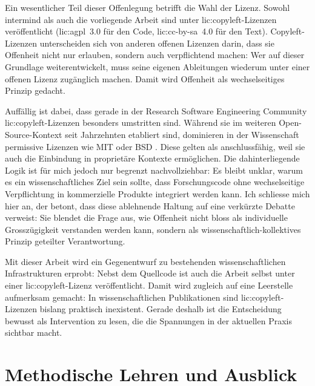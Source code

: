 Ein wesentlicher Teil dieser Offenlegung betrifft die Wahl der Lizenz. Sowohl \gls{intermind} als auch die vorliegende Arbeit sind unter \gls{lic:copyleft}-Lizenzen veröffentlicht (\gls{lic:agpl}~3.0 für den Code, \gls{lic:cc-by-sa}~4.0 für den Text). Copyleft-Lizenzen unterscheiden sich von anderen offenen Lizenzen darin, dass sie Offenheit nicht nur erlauben, sondern auch verpflichtend machen: Wer auf dieser Grundlage weiterentwickelt, muss seine eigenen Ableitungen wiederum unter einer offenen Lizenz zugänglich machen. Damit wird Offenheit als wechselseitiges Prinzip gedacht.

Auffällig ist dabei, dass gerade in der Research Software Engineering Community \gls{lic:copyleft}-Lizenzen besonders umstritten sind. Während sie im weiteren Open-Source-Kontext seit Jahrzehnten etabliert sind, dominieren in der Wissenschaft permissive Lizenzen wie MIT oder BSD \parencite{sethiWhyEarthAre2020}. Diese gelten als anschlussfähig, weil sie auch die Einbindung in proprietäre Kontexte ermöglichen. Die dahinterliegende Logik ist für mich jedoch nur begrenzt nachvollziehbar: Es bleibt unklar, warum es ein wissenschaftliches Ziel sein sollte, dass Forschungscode ohne wechselseitige Verpflichtung in kommerzielle Produkte integriert werden kann. Ich schliesse mich hier \textcite{sethiWhyEarthAre2020} an, der betont, dass diese ablehnende Haltung auf eine verkürzte Debatte verweist: Sie blendet die Frage aus, wie Offenheit nicht bloss als individuelle Grosszügigkeit verstanden werden kann, sondern als wissenschaftlich-kollektives Prinzip geteilter Verantwortung.

Mit dieser Arbeit wird ein Gegenentwurf zu bestehenden wissenschaftlichen Infrastrukturen erprobt: Nebst dem Quellcode ist auch die Arbeit selbst unter einer \gls{lic:copyleft}-Lizenz veröffentlicht. Damit wird zugleich auf eine Leerstelle aufmerksam gemacht: In wissenschaftlichen Publikationen sind \gls{lic:copyleft}-Lizenzen bislang praktisch inexistent. Gerade deshalb ist die Entscheidung bewusst als Intervention zu lesen, die die Spannungen in der aktuellen Praxis sichtbar macht.

\section{Methodische Lehren und Ausblick}

